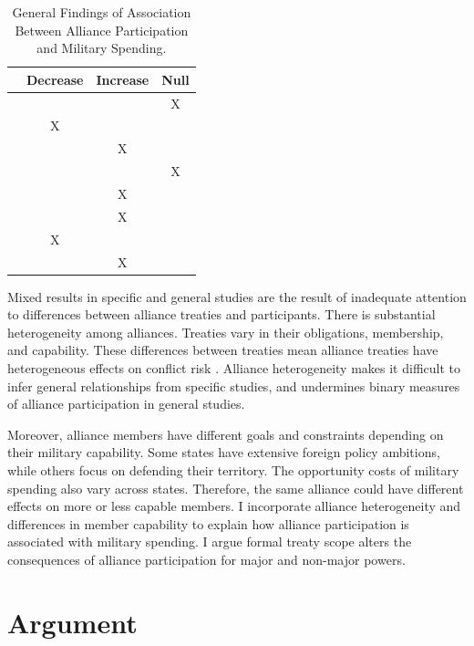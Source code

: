 \documentclass[12pt]{article}
\begin{document}
\begin{table}[hbt!]
\begin{center}
\begin{tabular}{lccc}
     & Decrease & Increase & Null \\
\hline
\citet{MostSiverson1987} &  &  & X \\
\citet{Conybeare1994} & X & &  \\
\citet{Diehl1994} &  & X &  \\
\citet{Goldsmith2003} &  &  & X \\
\citet{MorganPalmer2006} &  & X & \\ 
\citet{QuirozFlores2011} &  & X &  \\ 
\citet{DigiuseppePoast2016} & X &  & \\ 
\citet{Horowitzetal2017} &  & X & \\ 
\hline
\end{tabular}
\caption{General Findings of Association Between Alliance Participation and Military Spending.}
\label{tab:results-sum}
\end{center} 
\end{table}


Mixed results in specific and general studies are the result of inadequate attention to differences between alliance treaties and participants.
There is substantial heterogeneity among alliances.
Treaties vary in their obligations, membership, and capability. 
These differences between treaties mean alliance treaties have heterogeneous effects on conflict risk \citep{Leeds2003, Benson2012}. 
Alliance heterogeneity makes it difficult to infer general relationships from specific studies, and undermines binary measures of alliance participation in general studies. 
 

Moreover, alliance members have different goals and constraints depending on their military capability.
Some states have extensive foreign policy ambitions, while others focus on defending their territory. 
The opportunity costs of military spending also vary across states. 
Therefore, the same alliance could have different effects on more or less capable members. 
I incorporate alliance heterogeneity and differences in member capability to explain how alliance participation is associated with military spending. 
I argue formal treaty scope alters the consequences of alliance participation for major and non-major powers. 



\section{Argument}
\end{document}
